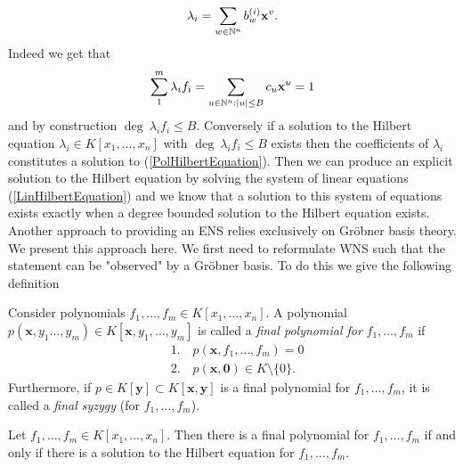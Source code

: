 $$\lambda_i = \sum_{w\in \mathbb{N}^n} b_w^{(i)}\mathbf{x}^v.$$
Indeed we get that 
$$\sum_1^m \lambda_i f_i = \sum_{u\in \mathbb{N}^n : \vert u\vert \leq B} c_u \mathbf{x}^u = 1$$
and by construction $\deg \ \lambda_i f_i \leq B.$ Conversely if a solution to the Hilbert equation $\lambda_i\in K[x_1,\dots,x_n]$ with $\deg \ \lambda_i f_i \leq B$ exists then the coefficients of $\lambda_i$ constitutes a solution to (\ref{PolHilbertEquation}). Then we can produce an explicit solution to the Hilbert equation by solving the system of linear equations (\ref{LinHilbertEquation}) and we know that a solution to this system of equations exists exactly when a degree bounded solution to the Hilbert equation exists.\\

Another approach to providing an ENS relies exclusively on Gröbner basis theory. We present this approach here. We first need to reformulate WNS such that the statement can be "observed" by a Gröbner basis. To do this we give the following definition
\begin{definition}\label{FinPol : 1}
    Consider polynomials $f_1,\dots,f_m\in K[x_1,\dots,x_n]$. A polynomial $p(\mathbf{x},y_1\dots,y_m) \in K[\mathbf{x},y_1,\dots,y_m]$ is called a \textit{final polynomial for} $f_1,\dots,f_m$ if 
    \begin{align*}
        &1.\quad p(\mathbf{x}, f_1,\dots, f_m) = 0\\
        &2. \quad p(\mathbf{x},\mathbf{0}) \in  K\setminus\{0\}.
    \end{align*}
    Furthermore, if $p\in K[\mathbf{y}]\subset K[\mathbf{x},\mathbf{y}]$ is a final polynomial for $f_1,\dots,f_m$, it is called a \textit{final syzygy} (for $f_1,\dots,f_m$).
\end{definition}
\begin{lemma}
    Let $f_1,\dots,f_m\in K[x_1,\dots,x_n]$. Then there is a final polynomial for $f_1,\dots,f_m$ if and only if there is a solution to the Hilbert equation for $f_1,\dots,f_m$.
\end{lemma}
